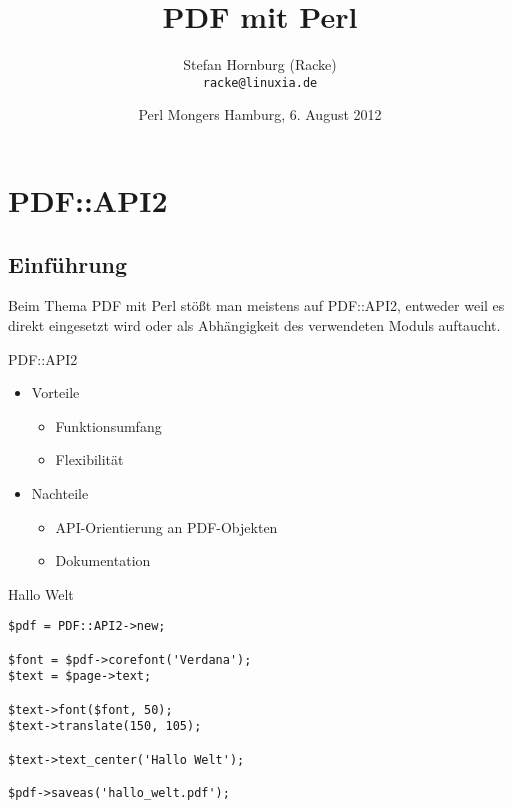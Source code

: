 \usepackage[utf8]{inputenc}
\usepackage[T1]{fontenc}
\usepackage{mathptmx}
\usepackage[scaled=.90]{helvet}
\usepackage{courier}

\usepackage{beamerthemesplit}
\usepackage{verbatim}
\usepackage{hyperref}
\usepackage{graphicx}

\usepackage{listings}
\lstset{language=Perl,basicstyle=\footnotesize,tabsize=3,showstringspaces=false}

\title{PDF mit Perl}
\author[racke]{Stefan Hornburg (Racke)\\ \texttt{racke@linuxia.de}}
\date[]{Perl Mongers Hamburg, 6. August 2012}


\maketitle{}

\begin{frame}
  \titlepage
\end{frame}

\tableofcontents

\section{PDF::API2}

\subsection{Einführung}

Beim Thema PDF mit Perl stößt man meistens auf PDF::API2,
entweder weil es direkt eingesetzt wird oder als Abhängigkeit
des verwendeten Moduls auftaucht.

\begin{frame}{PDF::API2}
\begin{itemize}
\item Vorteile
\begin{itemize}
\item Funktionsumfang
\item Flexibilität
\end{itemize}
\item Nachteile
\begin{itemize}
\item API-Orientierung an PDF-Objekten
\item Dokumentation
\end{itemize}
\end{itemize}
\end{frame}

\begin{frame}[fragile]{Hallo Welt}
\begin{lstlisting}
$pdf = PDF::API2->new;

$font = $pdf->corefont('Verdana');
$text = $page->text;

$text->font($font, 50);
$text->translate(150, 105);

$text->text_center('Hallo Welt');

$pdf->saveas('hallo_welt.pdf');
\end{lstlisting}
\end{frame}

